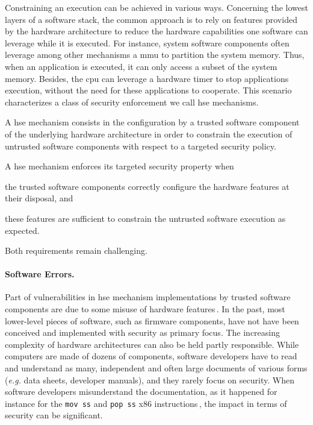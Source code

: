 Constraining an execution can be achieved in various ways.
%
Concerning the lowest layers of a software stack, the common approach is to rely
on features provided by the hardware architecture to reduce the hardware
capabilities one software can leverage while it is executed.
%
For instance, system software components often leverage among other mechanisms a
\ac{mmu} to partition the system memory.
%
Thus, when an application is executed, it can only access a subset of the system
memory.
%
Besides, the \ac{cpu} can leverage a hardware timer to stop applications
execution, without the need for these applications to cooperate.
%
This scenario characterizes a class of security enforcement we call \ac{hse}
mechanisms.

\begin{definition}
  A \ac{hse} mechanism consists in the configuration by a trusted software
  component of the underlying hardware architecture in order to constrain the
  execution of untrusted software components with respect to a targeted security
  policy.
\end{definition}

A \ac{hse} mechanism enforces its targeted security property when
%
\begin{inparaenum}[(1)]
\item the trusted software components correctly configure the hardware features
  at their disposal, and
%
\item these features are sufficient to constrain the untrusted software
  execution as expected.
\end{inparaenum}
%
Both requirements remain challenging.

\paragraph{Software Errors.}
%
Part of vulnerabilities in \ac{hse} mechanism implementations by trusted
software components are due to some misuse of hardware
features\,\cite{bulygin2014summary}.
%
In the past, most lower-level pieces of software, such as firmware components,
have not have been conceived and implemented with security as primary focus.
%
The increasing complexity of hardware architectures can also be held partly
responsible.
%
While computers are made of dozens of components, software developers have to
read and understand as many, independent and often large documents of various
forms (\emph{e.g.} data sheets, developer manuals), and they rarely focus on
security.
%
When software developers misunderstand the documentation, as it happened for
instance for the \texttt{mov ss} and \texttt{pop ss} x86
instructions\,\cite{movsspopss}, the impact in terms of security can be
significant.

